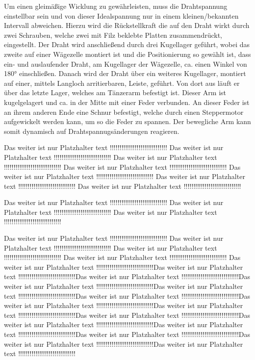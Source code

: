 Um einen gleimäßige Wicklung zu gewährleisten, muss die Drahtspannung einstellbar sein und von dieser Idealspannung nur in einem kleinen/bekannten Intervall abweichen. Hierzu wird die Rückstellkraft die auf den Draht wirkt durch zwei Schrauben, welche zwei mit Filz beklebte Platten zusammendrückt, eingestellt. Der Draht wird anschließend durch drei Kugellager geführt, wobei das zweite auf einer Wägezelle montiert ist und die Positionierung so gewählt ist, dass ein- und auslaufender Draht, am Kugellager der Wägezelle, ca. einen Winkel von 180° einschließen. Danach wird der Draht über ein weiteres Kugellager, montiert auf einer, mittels Langloch arritierbaren, Leiste, geführt. Von dort aus läuft er über das letzte Lager, welches am Tänzerarm befestigt ist. Dieser Arm ist kugelgelagert und ca. in der Mitte mit einer Feder verbunden. An dieser Feder ist an ihrem anderen Ende eine Schnur befestigt, welche durch einen Steppermotor aufgewickelt werden kann, um so die Feder zu spannen. Der bewegliche Arm kann somit dynamisch auf Drahtspannugsänderungen reagieren.




Das weiter ist nur Platzhalter text !!!!!!!!!!!!!!!!!!!!!!!!!!!!!!
Das weiter ist nur Platzhalter text !!!!!!!!!!!!!!!!!!!!!!!!!!!!!!
Das weiter ist nur Platzhalter text !!!!!!!!!!!!!!!!!!!!!!!!!!!!!!
Das weiter ist nur Platzhalter text !!!!!!!!!!!!!!!!!!!!!!!!!!!!!!
Das weiter ist nur Platzhalter text !!!!!!!!!!!!!!!!!!!!!!!!!!!!!!
Das weiter ist nur Platzhalter text !!!!!!!!!!!!!!!!!!!!!!!!!!!!!!
Das weiter ist nur Platzhalter text !!!!!!!!!!!!!!!!!!!!!!!!!!!!!!

Das weiter ist nur Platzhalter text !!!!!!!!!!!!!!!!!!!!!!!!!!!!!!
Das weiter ist nur Platzhalter text !!!!!!!!!!!!!!!!!!!!!!!!!!!!!!
Das weiter ist nur Platzhalter text !!!!!!!!!!!!!!!!!!!!!!!!!!!!!!

Das weiter ist nur Platzhalter text !!!!!!!!!!!!!!!!!!!!!!!!!!!!!!
Das weiter ist nur Platzhalter text !!!!!!!!!!!!!!!!!!!!!!!!!!!!!!
Das weiter ist nur Platzhalter text !!!!!!!!!!!!!!!!!!!!!!!!!!!!!!
Das weiter ist nur Platzhalter text !!!!!!!!!!!!!!!!!!!!!!!!!!!!!!
Das weiter ist nur Platzhalter text !!!!!!!!!!!!!!!!!!!!!!!!!!!!!!Das weiter ist nur Platzhalter text !!!!!!!!!!!!!!!!!!!!!!!!!!!!!!Das weiter ist nur Platzhalter text !!!!!!!!!!!!!!!!!!!!!!!!!!!!!!Das weiter ist nur Platzhalter text !!!!!!!!!!!!!!!!!!!!!!!!!!!!!!Das weiter ist nur Platzhalter text !!!!!!!!!!!!!!!!!!!!!!!!!!!!!!Das weiter ist nur Platzhalter text !!!!!!!!!!!!!!!!!!!!!!!!!!!!!!Das weiter ist nur Platzhalter text !!!!!!!!!!!!!!!!!!!!!!!!!!!!!!Das weiter ist nur Platzhalter text !!!!!!!!!!!!!!!!!!!!!!!!!!!!!!Das weiter ist nur Platzhalter text !!!!!!!!!!!!!!!!!!!!!!!!!!!!!!Das weiter ist nur Platzhalter text !!!!!!!!!!!!!!!!!!!!!!!!!!!!!!Das weiter ist nur Platzhalter text !!!!!!!!!!!!!!!!!!!!!!!!!!!!!!Das weiter ist nur Platzhalter text !!!!!!!!!!!!!!!!!!!!!!!!!!!!!!Das weiter ist nur Platzhalter text !!!!!!!!!!!!!!!!!!!!!!!!!!!!!!Das weiter ist nur Platzhalter text !!!!!!!!!!!!!!!!!!!!!!!!!!!!!!
